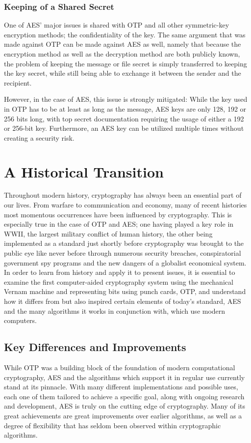 \documentclass[12pt, a4paper]{report}
\theoremstyle{definition}
\theoremstyle{remark}
\begin{document}
\subsection{Keeping of a Shared Secret}
One of AES' major issues is shared with OTP and all other symmetric-key encryption methods; the confidentiality of the key. The same argument that was made against OTP can be made against AES as well, namely that because the encryption method as well as the decryption method are both publicly known, the problem of keeping the message or file secret is simply transferred to keeping the key secret, while still being able to exchange it between the sender and the recipient.

However, in the case of AES, this issue is strongly mitigated: While the key used in OTP has to be at least as long as the message, AES keys are only 128, 192 or 256 bits long, with top secret documentation requiring the usage of either a 192 or 256-bit key\cite{CNSSPolicy}. Furthermore, an AES key can be utilized multiple times without creating a security risk.

\chapter{A Historical Transition}
Throughout modern history, cryptography has always been an essential part of our lives. From warfare to communication and economy, many of recent histories most momentous occurrences have been influenced by cryptography. This is especially true in the case of OTP and AES; one having played a key role in WWII, the largest military conflict of human history, the other being implemented as a standard just shortly before cryptography was brought to the public eye like never before through numerous security breaches, conspiratorial government spy programs and the new dangers of a globalist economical system. In order to learn from history and apply it to present issues, it is essential to examine the first computer-aided cryptography system using the mechanical Vernam machine and representing bits using punch cards\cite{VernamMachine}, OTP, and understand how it differs from but also inspired certain elements of today's standard, AES and the many algorithms it works in conjunction with, which use modern computers.

\section{Key Differences and Improvements}
While OTP was a building block of the foundation of modern computational cryptography, AES and the algorithms which support it in regular use currently stand at its pinnacle. With many different implementations and possible uses, each one of them tailored to achieve a specific goal, along with ongoing research and development, AES is truly on the cutting edge of cryptography. Many of its great achievements are great improvements over earlier algorithms, as well as a degree of flexibility that has seldom been observed within cryptographic algorithms.
\end{document}
